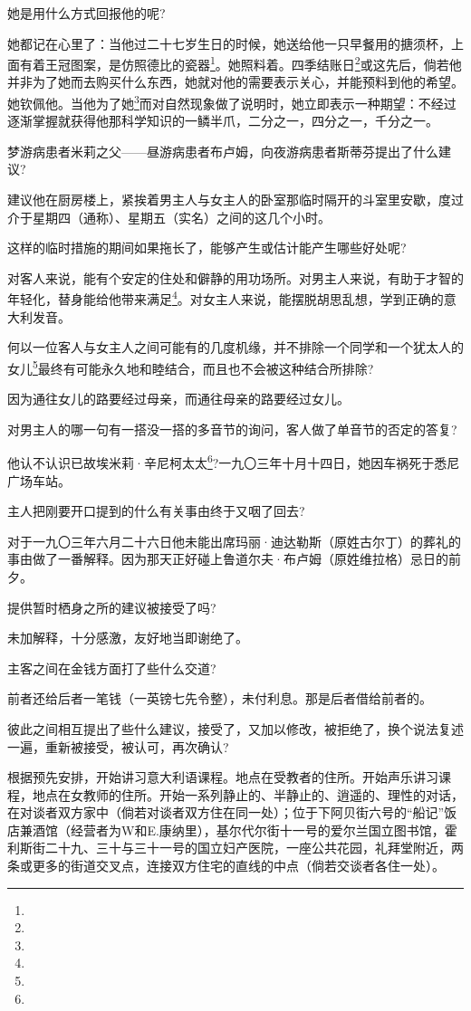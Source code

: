 \par 她是用什么方式回报他的呢?
\par 她都记在心里了：当他过二十七岁生日的时候，她送给他一只早餐用的搪须杯，上面有着王冠图案，是仿照德比的瓷器\footnote{}。她照料着。四季结账日\footnote{}或这先后，倘若他并非为了她而去购买什么东西，她就对他的需要表示关心，并能预料到他的希望。她钦佩他。当他为了她\footnote{}而对自然现象做了说明时，她立即表示一种期望：不经过逐渐掌握就获得他那科学知识的一鳞半爪，二分之一，四分之一，千分之一。
\par 梦游病患者米莉之父——昼游病患者布卢姆，向夜游病患者斯蒂芬提出了什么建议?
\par 建议他在厨房楼上，紧挨着男主人与女主人的卧室那临时隔开的斗室里安歇，度过介于星期四（通称）、星期五（实名）之间的这几个小时。
\par 这样的临时措施的期间如果拖长了，能够产生或估计能产生哪些好处呢?
\par 对客人来说，能有个安定的住处和僻静的用功场所。对男主人来说，有助于才智的年轻化，替身能给他带来满足\footnote{}。对女主人来说，能摆脱胡思乱想，学到正确的意大利发音。
\par 何以一位客人与女主人之间可能有的几度机缘，并不排除一个同学和一个犹太人的女儿\footnote{}最终有可能永久地和睦结合，而且也不会被这种结合所排除?
\par 因为通往女儿的路要经过母亲，而通往母亲的路要经过女儿。
\par 对男主人的哪一句有一搭没一搭的多音节的询问，客人做了单音节的否定的答复?
\par 他认不认识已故埃米莉·辛尼柯太太\footnote{}?一九〇三年十月十四日，她因车祸死于悉尼广场车站。
\par 主人把刚要开口提到的什么有关事由终于又咽了回去?
\par 对于一九〇三年六月二十六日他未能出席玛丽·迪达勒斯（原姓古尔丁）的葬礼的事由做了一番解释。因为那天正好碰上鲁道尔夫·布卢姆（原姓维拉格）忌日的前夕。
\par 提供暂时栖身之所的建议被接受了吗?
\par 未加解释，十分感激，友好地当即谢绝了。
\par 主客之间在金钱方面打了些什么交道?
\par 前者还给后者一笔钱（一英镑七先令整），未付利息。那是后者借给前者的。
\par 彼此之间相互提出了些什么建议，接受了，又加以修改，被拒绝了，换个说法复述一遍，重新被接受，被认可，再次确认?
\par 根据预先安排，开始讲习意大利语课程。地点在受教者的住所。开始声乐讲习课程，地点在女教师的住所。开始一系列静止的、半静止的、逍遥的、理性的对话，在对谈者双方家中（倘若对谈者双方住在同一处）；位于下阿贝街六号的“船记”饭店兼酒馆（经营者为W和E.康纳里），基尔代尔街十一号的爱尔兰国立图书馆，霍利斯街二十九、三十与三十一号的国立妇产医院，一座公共花园，礼拜堂附近，两条或更多的街道交叉点，连接双方住宅的直线的中点（倘若交谈者各住一处）。
